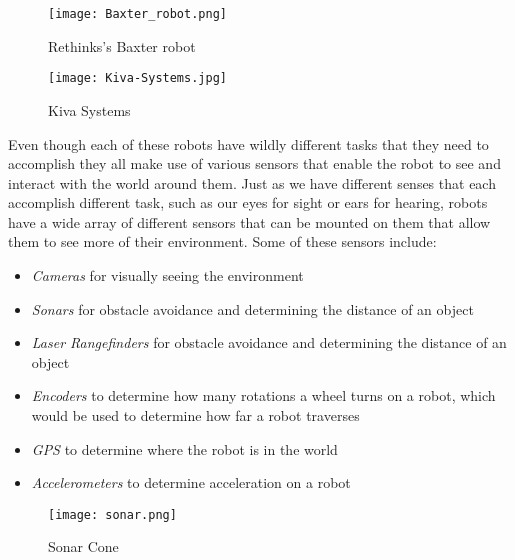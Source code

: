 \documentclass[12pt]{article}
\begin{document}
\begin{figure}[htp!]
	\begin{center}
		\texttt{[image: Baxter\_robot.png]}
		\caption{Rethinks's Baxter robot }  \label{fig.baxter}
	\end{center}
\end{figure}

\begin{figure}[htp!]
	\begin{center}
		\texttt{[image: Kiva-Systems.jpg]}
		\caption{Kiva Systems}  \label{fig.kiva}
	\end{center}
\end{figure}


Even though each of these robots have wildly different tasks that they need to accomplish they all make use of various sensors that enable the robot to see and interact with the world around them. Just as we have different senses that each accomplish different task, such as our eyes for sight or ears for hearing, robots have a wide array of different sensors that can be mounted on them that allow them to see more of their environment. Some of these sensors include:
\begin{itemize}
	\item \textit{Cameras} for visually seeing the environment
	\item \textit{Sonars} for obstacle avoidance and determining the distance of an object 
	\item \textit{Laser Rangefinders} for obstacle avoidance and determining the distance of an object
	\item \textit{Encoders} to determine how many rotations a wheel turns on a robot, which would be used to determine how far a robot traverses
	\item \textit{GPS} to determine where the robot is in the world
	\item \textit{Accelerometers} to determine acceleration on a robot
\end{itemize}

\begin{figure}[htp!]
	\begin{center}
		\texttt{[image: sonar.png]}
		\caption{Sonar Cone}  \label{fig.sonar}
	\end{center}
\end{figure}
\end{document}
